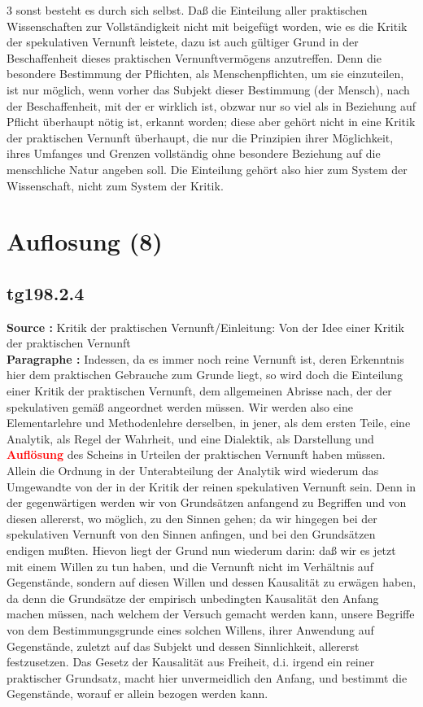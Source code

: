 \documentclass[a4paper,12pt,twoside]{book}
\newcommand{\match}[1]{\textcolor{red}{\textbf{#1}}}
\newcommand{\unnumberedsection}[1]{
	\section*{#1}
	\addcontentsline{toc}{section}{#1}
	\markright{#1}
}
\begin{document}
	
	3
	sonst besteht es durch sich selbst. Daß die Einteilung aller praktischen Wissenschaften zur Vollständigkeit nicht mit beigefügt worden, wie es die Kritik der spekulativen Vernunft leistete, dazu ist auch gültiger Grund in der Beschaffenheit dieses praktischen Vernunftvermögens anzutreffen. Denn die besondere Bestimmung der Pflichten, als Menschenpflichten, um sie einzuteilen, ist nur möglich, wenn vorher das Subjekt dieser Bestimmung (der Mensch), nach der Beschaffenheit, mit der er wirklich ist, obzwar nur so viel als in Beziehung auf Pflicht überhaupt nötig ist, erkannt worden; diese aber gehört nicht in eine Kritik der praktischen Vernunft überhaupt, die nur die Prinzipien ihrer Möglichkeit, ihres Umfanges und Grenzen vollständig ohne besondere Beziehung auf die menschliche Natur angeben soll. Die Einteilung gehört also hier zum System der Wissenschaft, nicht zum System der Kritik. 
	
	\unnumberedsection{Auflosung (8)} 
	\subsection*{tg198.2.4} 
	\textbf{Source : }Kritik der praktischen Vernunft/Einleitung: Von der Idee einer Kritik der praktischen Vernunft\\  
	
	\noindent\textbf{Paragraphe : }Indessen, da es immer noch reine Vernunft ist, deren Erkenntnis hier dem praktischen Gebrauche zum Grunde liegt, so wird doch die Einteilung einer Kritik der praktischen Vernunft, dem allgemeinen Abrisse nach, der der spekulativen gemäß angeordnet werden müssen. Wir werden also eine Elementarlehre und Methodenlehre derselben, in jener, als dem ersten Teile, eine Analytik, als Regel der Wahrheit, und eine Dialektik, als Darstellung und \match{Auflösung} des Scheins in Urteilen der praktischen Vernunft haben müssen. Allein die Ordnung in der Unterabteilung der Analytik wird wiederum das Umgewandte von der in der Kritik der reinen spekulativen Vernunft sein. Denn in der gegenwärtigen werden wir von Grundsätzen anfangend zu Begriffen und von diesen allererst, wo möglich, zu den Sinnen gehen; da wir hingegen bei der spekulativen Vernunft von den Sinnen anfingen, und bei den Grundsätzen endigen mußten. Hievon liegt der Grund nun wiederum darin: daß wir es jetzt mit einem Willen zu tun haben, und die Vernunft nicht im Verhältnis auf Gegenstände, sondern auf diesen Willen und dessen Kausalität zu erwägen haben, da denn die Grundsätze der empirisch unbedingten Kausalität den Anfang machen müssen, nach welchem der Versuch gemacht werden kann, unsere Begriffe von dem Bestimmungsgrunde eines solchen Willens, ihrer Anwendung auf Gegenstände, zuletzt auf das Subjekt und dessen Sinnlichkeit, allererst festzusetzen. Das Gesetz der Kausalität aus Freiheit, d.i. irgend ein reiner praktischer Grundsatz, macht hier unvermeidlich den Anfang, und bestimmt die Gegenstände, worauf er allein bezogen werden kann. 
	
\end{document}
